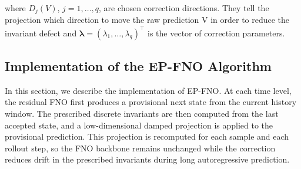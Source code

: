 \documentclass[11pt,a4paper]{article}
\theoremstyle{definition}
\theoremstyle{remark}
\numberwithin{equation}{section}
\numberwithin{figure}{section}
\numberwithin{table}{section}
\begin{document}
where \(D_j(V)\), \(j=1,\ldots,q\), are chosen correction directions. They tell the projection which direction to move the raw prediction V in order to reduce the invariant defect and
\(\boldsymbol\lambda=(\lambda_1,\ldots,\lambda_q)^\top\) is the vector of
correction parameters. 

\subsection{Implementation of the EP-FNO Algorithm}

In this section, we describe the implementation of EP-FNO. At each
time level, the residual FNO first produces a provisional next state from the
current history window. The prescribed discrete invariants are then computed
from the last accepted state, and a low-dimensional damped projection is applied
to the provisional prediction. This projection is recomputed for each sample and
each rollout step, so the FNO backbone remains unchanged while the correction
reduces drift in the prescribed invariants during long autoregressive prediction.
\end{document}
